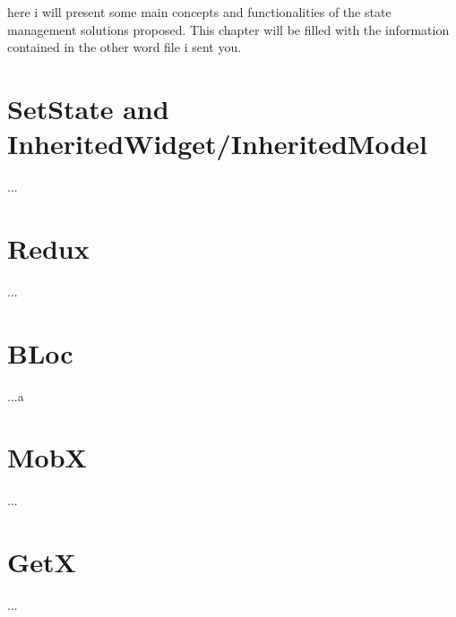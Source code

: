 here i will present some main concepts and functionalities of the state management solutions proposed. This chapter will be filled with the information contained in the other word file i sent you.
\section{SetState and InheritedWidget/InheritedModel}
\label{sec:setState}

...
\section{Redux}
\label{sec:Redux}

...
\section{BLoc}
\label{sec:BLoC}

...a
\section{MobX}
\label{sec:MobX}

...
\section{GetX}
\label{sec:GetX}

...